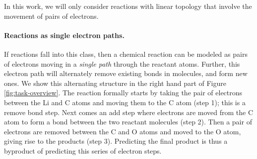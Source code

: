 In this work, we will only consider reactions with linear topology that involve the movement of pairs of electrons.


\vspace{-0.15cm}
\paragraph{Reactions as single electron paths.}
If reactions fall into this class, then a chemical reaction can be modeled as pairs of electrons moving in a \emph{single path} through the reactant atoms. 
Further, this electron path will alternately remove existing bonds in molecules, and form new ones. We show this alternating structure in the right hand part of Figure \ref{fig:task-overview}. 
The reaction formally starts by taking the pair of electrons between the Li and C atoms and moving them to the C atom (step 1); this is a remove bond step. 
Next comes an add step where electrons are moved from the C atom to form a bond between the two reactant molecules (step 2).
Then a pair of electrons are removed between the C and O atoms and moved to the O atom, giving rise to the products (step 3). 
Predicting the final product is thus a byproduct of predicting this series of electron steps.

